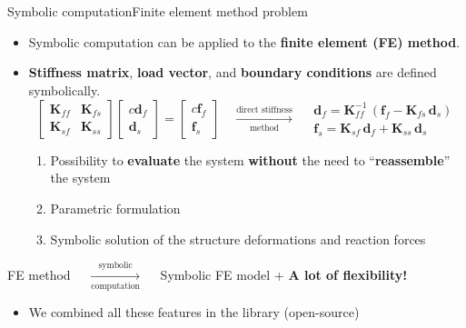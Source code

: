 \begin{frame}{Symbolic computation}{Finite element method problem}
  \begin{itemize}
    \item Symbolic computation can be applied to the \textbf{finite element (FE) method}. \\
    \item \textbf{Stiffness matrix}, \textbf{load vector}, and \textbf{boundary conditions} are defined symbolically. \\
    \begin{equation*}
      \begin{bmatrix}
        \mathbf{K}_{ff} & \mathbf{K}_{fs} \\
        \mathbf{K}_{sf} & \mathbf{K}_{ss}
      \end{bmatrix} \begin{bmatrix}{c}
        \mathbf{d}_{f} \\
        \mathbf{d}_{s}
      \end{bmatrix} = \begin{bmatrix}{c}
        \mathbf{f}_{f} \\
        \mathbf{f}_{s}
      \end{bmatrix}
      \quad \xrightarrow[\text{method}]{\text{direct stiffness}} \quad
      \begin{array}{c}
        \mathbf{d}_{f} = \mathbf{K}_{ff}^{-1}\,\left(\mathbf{f}_{f} - \mathbf{K}_{fs}\,\mathbf{d}_{s}\right) \\
        \mathbf{f}_{s} = \mathbf{K}_{sf}\,\mathbf{d}_{f} + \mathbf{K}_{ss}\,\mathbf{d}_{s}
      \end{array}
    \end{equation*}
    \begin{enumerate}
      \item Possibility to \textbf{evaluate} the system \textbf{without} the need to ``\textbf{reassemble}'' the system \\
      \item Parametric formulation \\
      \item Symbolic solution of the structure deformations and reaction forces \\
    \end{enumerate}
  \end{itemize}
  \begin{center}\begin{minipage}{10.75cm}\begin{block}{}
    \centering
    FE method $\quad \xrightarrow[\text{computation}]{\text{symbolic}} \quad$ Symbolic FE model + \textcolor{mycolor5}{\textbf{A lot of flexibility!}}
  \end{block}\end{minipage}\end{center}
  \begin{itemize}
    \item We combined all these features in the \Maple{} \TrussMe{} library (open-source)
  \end{itemize}
\end{frame}

